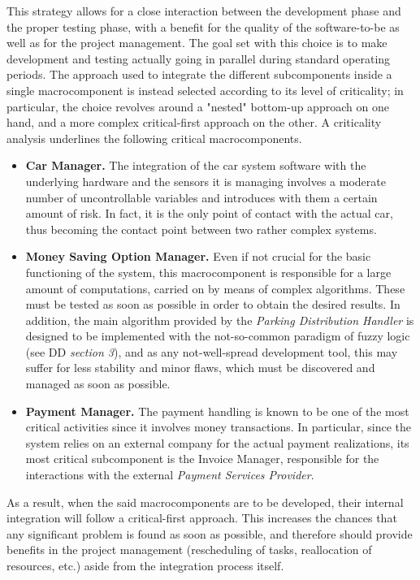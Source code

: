 	This strategy allows for a close interaction between the development phase and the proper testing phase, with a benefit for the quality of the software-to-be as well as for the project management. The goal set with this choice is to make development and testing actually going in parallel during standard operating periods. %
	The approach used to integrate the different subcomponents inside a single macrocomponent is instead selected according to its level of criticality; in particular, the choice revolves around a "nested" bottom-up approach on one hand, and a more complex critical-first approach on the other.
	A criticality analysis underlines the following critical macrocomponents.
	\begin{itemize}
		\item \textbf{Car Manager.} The integration of the car system software with the underlying hardware and the sensors it is managing involves a moderate number of uncontrollable variables and introduces with them a certain amount of risk. In fact, it is the only point of contact with the actual car, thus becoming the contact point between two rather complex systems.
		\item \textbf{Money Saving Option Manager.} Even if not crucial for the basic functioning of the system, this macrocomponent is responsible for a large amount of computations, carried on by means of complex algorithms. These must be tested as soon as possible in order to obtain the desired results. In addition, the main algorithm provided by the \textit{Parking Distribution Handler} is designed to be implemented with the not-so-common paradigm of fuzzy logic (see DD \textit{section 3}), and as any not-well-spread development tool, this may suffer for less stability and minor flaws, which must be discovered and managed as soon as possible.
		\item \textbf{Payment Manager.} The payment handling is known to be one of the most critical activities since it involves money transactions. In particular, since the system relies on an external company for the actual payment realizations, its most critical subcomponent is the Invoice Manager, responsible for the interactions with the external \textit{Payment Services Provider}.
	\end{itemize}
	As a result, when the said macrocomponents are to be developed, their internal integration will follow a critical-first approach. This increases the chances that any significant problem is found as soon as possible, and therefore should provide benefits in the project management (rescheduling of tasks, reallocation of resources, etc.) aside from the integration process itself.

